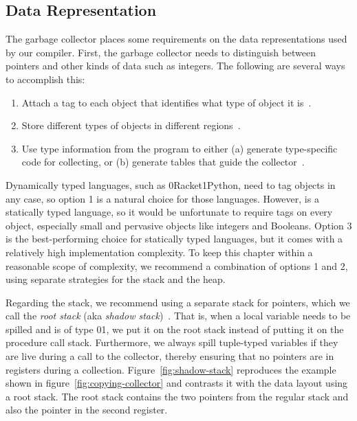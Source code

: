 \documentclass[7x10]{TimesAPriori_MIT}%
\def\racketEd{0}
\def\pythonEd{1}
\def\edition{1}
\newcommand{\racket}[1]{{\if\edition\racketEd{#1}\fi}}
\newcommand{\pythonColor}[0]{}
\newcommand{\python}[1]{{\if\edition\pythonEd\pythonColor #1\fi}}
\numberwithin{theorem}{chapter}
\numberwithin{definition}{chapter}
\numberwithin{equation}{chapter}
\begin{document}
\subsection{Data Representation}
\label{sec:data-rep-gc}

The garbage collector places some requirements on the data
representations used by our compiler. First, the garbage collector
needs to distinguish between pointers and other kinds of data such as
integers. The following are several ways to accomplish this:
\begin{enumerate}
\item Attach a tag to each object that identifies what type of
  object it is~\citep{McCarthy:1960dz}.
\item Store different types of objects in different
  regions~\citep{Steele:1977ab}.
\item Use type information from the program to either (a) generate
  type-specific code for collecting, or (b) generate tables that 
  guide the collector~\citep{Appel:1989aa,Goldberg:1991aa,Diwan:1992aa}.
\end{enumerate}
Dynamically typed languages, such as \racket{Racket}\python{Python},
need to tag objects in any case, so option 1 is a natural choice for those
languages.  However, \LangVec{} is a statically typed language, so it
would be unfortunate to require tags on every object, especially small
and pervasive objects like integers and Booleans.  Option 3 is the
best-performing choice for statically typed languages, but it comes with
a relatively high implementation complexity. To keep this chapter
within a reasonable scope of complexity, we recommend a combination of options
1 and 2, using separate strategies for the stack and the heap.

Regarding the stack, we recommend using a separate stack for pointers,
which we call the \emph{root stack}
(aka \emph{shadow stack})~\citep{Siebert:2001aa,Henderson:2002aa,Baker:2009aa}.
That is, when a local variable needs to be spilled and is of type
\racket{}\python{}, we put it on the
root stack instead of putting it on the procedure call
stack. Furthermore, we always spill tuple-typed variables if they are
live during a call to the collector, thereby ensuring that no pointers
are in registers during a collection. Figure~\ref{fig:shadow-stack}
reproduces the example shown in figure~\ref{fig:copying-collector} and
contrasts it with the data layout using a root stack. The root stack
contains the two pointers from the regular stack and also the pointer
in the second register.
\end{document}
